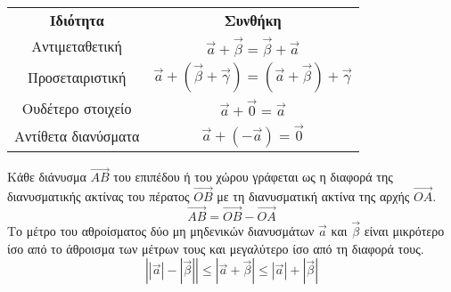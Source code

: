 \documentclass[twoside,nofonts,internet,shmeiwseis]{thewria}
\begin{document}
\begin{center}
\begin{tabular}{cc}
\hline \rule[-2ex]{0pt}{5.5ex} \textbf{Ιδιότητα} & \textbf{Συνθήκη}  \\ 
\hhline{==} \rule[-2ex]{0pt}{5.5ex} Αντιμεταθετική & $ \vec{a}+\vec{\beta}=\vec{\beta}+\vec{a} $  \\ 
 \rule[-2ex]{0pt}{5.5ex} Προσεταιριστική & $ \vec{a}+\left( \vec{\beta}+\vec{\gamma}\right) =\left( \vec{a}+\vec{\beta}\right) +\vec{\gamma} $  \\ 
 \rule[-2ex]{0pt}{5.5ex} Ουδέτερο στοιχείο & $ \vec{a}+\vec{0}=\vec{a} $  \\ 
  \rule[-2ex]{0pt}{5.5ex} Αντίθετα διανύσματα & $ \vec{a}+(-\vec{a})=\vec{0} $  \\
\hline 
\end{tabular}
\end{center}
\vspace{3mm}
Κάθε διάνυσμα $ \overrightarrow{AB} $ του επιπέδου ή του χώρου γράφεται ως η διαφορά της διανυσματικής ακτίνας του πέρατος $ \overrightarrow{OB} $ με τη διανυσματική ακτίνα της αρχής $ \overrightarrow{OA} $.
\[ \overrightarrow{AB}=\overrightarrow{OB}-\overrightarrow{OA} \]
Το μέτρο του αθροίσματος δύο μη μηδενικών διανυσμάτων $ \vec{a} $ και $ \vec{\beta} $ είναι μικρότερο ίσο από το άθροισμα των μέτρων τους και μεγαλύτερο ίσο από τη διαφορά τους.
\[ \left||\vec{a}|-|\vec{\beta}| \right| \leq\left|\vec{a}+\vec{\beta}\right|\leq|\vec{a}|+|\vec{\beta}|  \]
\end{document}
